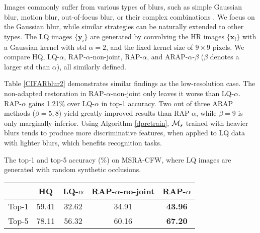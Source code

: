 \documentclass[10pt,twocolumn,twoside]{IEEEtran} %
\begin{document}
Images commonly suffer from various types of blurs, such as simple Gaussian blur, motion blur, out-of-focus blur, or their complex combinations \cite{zhang2011close}. We focus on the Gaussian blur, while similar strategies can be naturally extended to other types. The LQ images $\{\mathbf{y}_i\}$ are generated by convolving the HR images $\{\mathbf{x}_i\}$ with a Gaussian kernel with std $\alpha = 2$, and the fixed kernel size of $9\times9$ pixels. We compare HQ, LQ-$\alpha$, RAP-$\alpha$-non-joint, RAP-$\alpha$, and ARAP-$\alpha$-$\beta$ ($\beta$ denotes a larger std than $\alpha$), all similarly defined. 

Table \ref{CIFARblur2} demonstrates similar findings as the low-resolution case. The non-adapted restoration in RAP-$\alpha$-non-joint only leaves it worse than LQ-$\alpha$. RAP-$\alpha$ gains 1.21\% over LQ-$\alpha$ in top-1 accuracy. Two out of three ARAP methods ($\beta = 5, 8$) yield greatly improved results than RAP-$\alpha$, while $\beta = 9$ is only marginally inferior. Using Algorithm \ref{dpretrain}, ${\mathcal{M}}_s$ trained with heavier blurs 
tends to produce more discriminative features, when applied to LQ data with lighter blurs, which benefits recognition tasks.
	\fontsize{10pt}{12pt}\selectfont
	\caption{The top-1 and top-5 accuracy (\%) on MSRA-CFW, where LQ images are generated with random synthetic occlusions.}
	\begin{center}
		\begin{tabular}{c|c|c|c|c}
			\hline
			& HQ & LQ-$\alpha$ & RAP-$\alpha$-no-joint & RAP-$\alpha$ \\ \hline
			\hline
			Top-1  & 59.41 & 32.62 & 34.91 & \textbf{43.96} \\ 
			Top-5  & 78.11 & 56.32 & 60.16 & \textbf{67.20} \\ \hline
		\end{tabular}
	\end{center}
	
\end{document}
